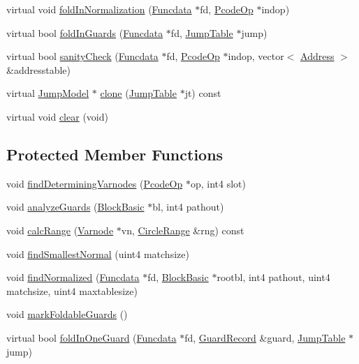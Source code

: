 \begin{DoxyCompactItemize}
\item 
virtual void \mbox{\hyperlink{class_jump_basic_a4f3c7e75f6b89afd01e64950959e114d}{fold\+In\+Normalization}} (\mbox{\hyperlink{class_funcdata}{Funcdata}} $\ast$fd, \mbox{\hyperlink{class_pcode_op}{Pcode\+Op}} $\ast$indop)
\item 
virtual bool \mbox{\hyperlink{class_jump_basic_ae70d6baeeecb4b16e79de8516868ffe4}{fold\+In\+Guards}} (\mbox{\hyperlink{class_funcdata}{Funcdata}} $\ast$fd, \mbox{\hyperlink{class_jump_table}{Jump\+Table}} $\ast$jump)
\item 
virtual bool \mbox{\hyperlink{class_jump_basic_a1cba6b6c963e4a70efc439c27e53bd44}{sanity\+Check}} (\mbox{\hyperlink{class_funcdata}{Funcdata}} $\ast$fd, \mbox{\hyperlink{class_pcode_op}{Pcode\+Op}} $\ast$indop, vector$<$ \mbox{\hyperlink{class_address}{Address}} $>$ \&addresstable)
\item 
virtual \mbox{\hyperlink{class_jump_model}{Jump\+Model}} $\ast$ \mbox{\hyperlink{class_jump_basic_a3f79f34542045666ebfc491e83f2bc27}{clone}} (\mbox{\hyperlink{class_jump_table}{Jump\+Table}} $\ast$jt) const
\item 
virtual void \mbox{\hyperlink{class_jump_basic_a51a677ac029723dbdee9879d865f7e3f}{clear}} (void)
\end{DoxyCompactItemize}
\subsection*{Protected Member Functions}
\begin{DoxyCompactItemize}
\item 
void \mbox{\hyperlink{class_jump_basic_a4a9fc453c42caeb6857b80d4e216d544}{find\+Determining\+Varnodes}} (\mbox{\hyperlink{class_pcode_op}{Pcode\+Op}} $\ast$op, int4 slot)
\item 
void \mbox{\hyperlink{class_jump_basic_ae00e064a5ca6c4dcd06e245fbc997e5b}{analyze\+Guards}} (\mbox{\hyperlink{class_block_basic}{Block\+Basic}} $\ast$bl, int4 pathout)
\item 
void \mbox{\hyperlink{class_jump_basic_ad7d08e00d715fb0b2edce7d4d09a71f2}{calc\+Range}} (\mbox{\hyperlink{class_varnode}{Varnode}} $\ast$vn, \mbox{\hyperlink{class_circle_range}{Circle\+Range}} \&rng) const
\item 
void \mbox{\hyperlink{class_jump_basic_a32cfae8f5cf7b8573e09d415e2b1da52}{find\+Smallest\+Normal}} (uint4 matchsize)
\item 
void \mbox{\hyperlink{class_jump_basic_aefc7762595790f46334f6e09a88e4432}{find\+Normalized}} (\mbox{\hyperlink{class_funcdata}{Funcdata}} $\ast$fd, \mbox{\hyperlink{class_block_basic}{Block\+Basic}} $\ast$rootbl, int4 pathout, uint4 matchsize, uint4 maxtablesize)
\item 
void \mbox{\hyperlink{class_jump_basic_a8a8537f11c7ee4431d0b7ccce30d3241}{mark\+Foldable\+Guards}} ()
\item 
virtual bool \mbox{\hyperlink{class_jump_basic_a27ac3c21abdfc602f857802a7479c6d4}{fold\+In\+One\+Guard}} (\mbox{\hyperlink{class_funcdata}{Funcdata}} $\ast$fd, \mbox{\hyperlink{class_guard_record}{Guard\+Record}} \&guard, \mbox{\hyperlink{class_jump_table}{Jump\+Table}} $\ast$jump)
\end{DoxyCompactItemize}
